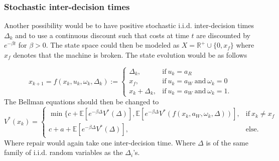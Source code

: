 \subsubsection{Stochastic inter-decision times}
Another possibility would be to have positive stochastic i.i.d. inter-decision times $\Delta_k$ and to use a continuous discount such that costs at time $t$ are discounted by $e^{-\beta t}$ for $\beta>0$.
The state space could then be modeled as $X=\mathbb{R}^+\cup\{0,x_f\}$ where $x_f$ denotes that the machine is broken.
The state evolution would be as follows

\begin{equation}
x_{k+1}=f(x_k,u_k,\omega_k,\Delta_k):=\begin{cases}
\Delta_k,&\text{if}\ u_k=a_R \\
x_f,&\text{if}\ u_k=a_W\ \text{and}\ \omega_k=0 \\
x_k+\Delta_k,&\text{if}\ u_k=a_W\ \text{and}\ \omega_k=1.
\end{cases}
\end{equation}
The Bellman equations should then be changed to
\begin{equation}
V^*(x_k)=\begin{cases}
\min\{c+\mathbb{E}[e^{-\beta \Delta} V^*(\Delta)],\mathbb{E}[e^{-\beta \Delta} V^*(f(x_k,a_W,\omega_k,\Delta))],&\text{if}\ x_k\neq x_f \\
c+a+\mathbb{E}[e^{-\beta \Delta} V^*(\Delta)],&\text{else.}
\end{cases}
\end{equation}
Where repair would again take one inter-decision time. Where $\Delta$ is of the same family of i.i.d. random variables as the $\Delta_i$'s.

